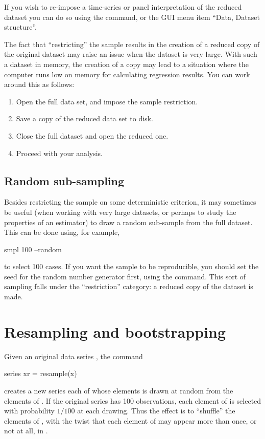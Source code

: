 If you wish to re-impose a time-series or panel interpretation of the
reduced dataset you can do so using the  command, or the
GUI menu item ``Data, Dataset structure''.

The fact that ``restricting'' the sample results in the creation of a
reduced copy of the original dataset may raise an issue when the
dataset is very large.  With such a dataset in memory, the creation of
a copy may lead to a situation where the computer runs low on memory
for calculating regression results.  You can work around this as
follows:

\begin{enumerate}
\item Open the full data set, and impose the sample restriction.
\item Save a copy of the reduced data set to disk.
\item Close the full dataset and open the reduced one.
\item Proceed with your analysis.
\end{enumerate}

\subsection{Random sub-sampling}
\label{sample-random}

Besides restricting the sample on some deterministic criterion, it may
sometimes be useful (when working with very large datasets, or perhaps
to study the properties of an estimator) to draw a random sub-sample
from the full dataset.  This can be done using, for example,
%
\begin{code}
smpl 100 --random
\end{code}
%
to select 100 cases.  If you want the sample to be reproducible, you
should set the seed for the random number generator first, using the
 command.  This sort of sampling falls under the
``restriction'' category: a reduced copy of the dataset is made.

\section{Resampling and bootstrapping}
\label{sec:resampling}

Given an original data series , the command
%
\begin{code}
series xr = resample(x)
\end{code}
%
creates a new series each of whose elements is drawn at random from
the elements of .  If the original series has 100
observations, each element of  is selected with probability
$1/100$ at each drawing.  Thus the effect is to ``shuffle'' the
elements of , with the twist that each element of
 may appear more than once, or not at all, in .

